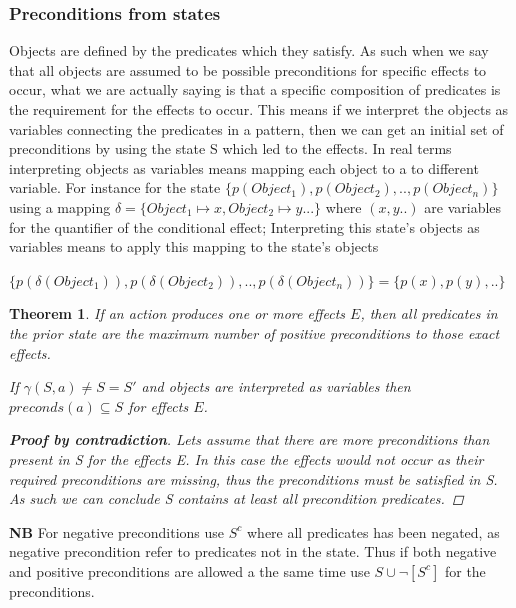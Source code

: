 \documentclass[../Master.tex]{subfiles}
\begin{document}
\subsubsection{Preconditions from states}
Objects are defined by the predicates which they satisfy. As such when we say that all objects are assumed to be possible preconditions for specific effects to occur, what we are actually saying is that a specific composition of predicates is the requirement for the effects to occur.
This means if we interpret the objects as variables connecting the predicates in a pattern, then we can get an initial set of preconditions by using the state S which led to the effects. In real terms interpreting objects as variables means mapping each object to a to different variable. For instance for the state 
$\{ p(Object_1), p(Object_2),..,p(Object_n)\}$ using a mapping 
$\delta = \{Object_1 \mapsto x, Object_2 \mapsto y...\}$ 
where $(x, y..)$ are variables for the quantifier of the conditional effect; Interpreting this state's objects as variables means to apply this mapping to the state's objects 

$\{ p(\delta(Object_1)), p(\delta(Object_2)),..,p(\delta(Object_n))\} = \{ p(x), p(y),..\}$


\newtheorem{thm-precondition-state}{Theorem}
\begin{thm-precondition-state}\label{thm:precondition-state}
If an action produces one or more effects $E$, then all predicates in the prior state are the maximum number of positive preconditions to those exact effects.	

	If $\gamma (S,a) \neq S = S'$ and objects are interpreted as variables then $preconds(a) \subseteq S$  for effects $E$.
\begin{proof}[\textbf{Proof by contradiction}] Lets assume that there are more preconditions than present in S for the effects E.
	In this case the effects would not occur as their required preconditions are missing, thus the preconditions must be satisfied in S. 
	As such we can conclude S contains at least all precondition predicates.    \qedhere
\end{proof}
\end{thm-precondition-state}

\textbf{NB} For negative preconditions use $S^c$ where all predicates has been negated, as negative precondition refer to predicates not in the state. 
Thus if both negative and positive preconditions are allowed a the same time use  $S \cup \neg[S^c] $ for the preconditions.  
\end{document}
